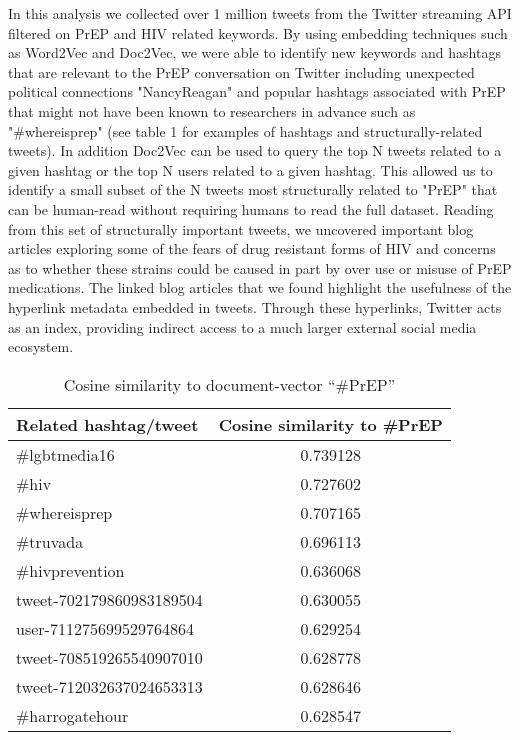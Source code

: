 In this analysis we collected over 1 million tweets from the Twitter streaming API filtered on PrEP and HIV related keywords. By using embedding techniques such as Word2Vec and Doc2Vec, we were able to identify new keywords and hashtags that are relevant to the PrEP conversation on Twitter including unexpected political connections "NancyReagan" and popular hashtags associated with PrEP that might not have been known to researchers in advance such as "\#whereisprep" (see table 1 for examples of hashtags and structurally-related tweets). In addition Doc2Vec can be used to query the top N tweets related to a given hashtag or the top N users related to a given hashtag. This allowed us to identify a small subset of the N tweets most structurally related to "PrEP" that can be human-read without requiring humans to read the full dataset. Reading from this set of structurally important tweets, we uncovered important blog articles exploring some of the fears of drug resistant forms of HIV and concerns as to whether these strains could be caused in part by over use or misuse of PrEP medications. The linked blog articles that we found highlight the usefulness of the hyperlink metadata embedded in tweets. Through these hyperlinks, Twitter acts as an index, providing indirect access to a much larger external social media ecosystem.

\begin{table}
\centering
\caption{Cosine similarity to document-vector ``\#PrEP''}
\begin{tabular}{|l|c|} \hline
Related hashtag/tweet & Cosine similarity to \#PrEP\\ \hline
\#lgbtmedia16 & 0.739128\\ \hline
\#hiv & 	0.727602 \\ \hline
\#whereisprep & 0.707165 \\ \hline
\#truvada & 0.696113 \\ \hline
\#hivprevention & 0.636068 \\ \hline
tweet-702179860983189504 & 0.630055\\ \hline
user-711275699529764864 & 0.629254\\ \hline
tweet-708519265540907010 & 0.628778 \\ \hline
tweet-712032637024653313 & 0.628646 \\ \hline
\#harrogatehour & 0.628547 \\ \hline
\hline\end{tabular}
\label{tbl:d2v}
\end{table}

